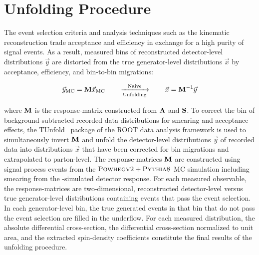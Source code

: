 \section{Unfolding Procedure}
The event selection criteria and analysis techniques such as the \ttbar kinematic reconstruction trade acceptance and efficiency in exchange for a high purity of signal events.
As a result, measured bins of reconstructed detector-level distributions $\vec{y}$ are distorted from the true generator-level distributions $\vec{x}$ by acceptance, efficiency, and bin-to-bin migrations:
\begin{linenomath*}
\begin{align}
\vec{y}_{\text{MC}} = \mathbf{M} \vec{x}_{\text{MC}} \quad \quad \xrightarrow[\text{Unfolding}]{\text{Naive}} \quad \quad \vec{x} = \mathbf{M}^{-1} \vec{y}
\end{align}
\end{linenomath*}
where $\mathbf{M}$ is the response-matrix constructed from $\mathbf{A}$ and $\mathbf{S}$.
To correct the bin of background-subtracted recorded data distributions for smearing and acceptance effects, the TUnfold~\cite{TUnfold} package of the ROOT data analysis framework is used to simultaneously invert $\mathbf{M}$ and unfold the detector-level distributions $\vec{y}$ of recorded data into distributions $\vec{x}$ that have been corrected for bin migrations and extrapolated to parton-level.
The response-matrices $\mathbf{M}$ are constructed using signal process events from the ${\textsc{Powhegv2}} + {\textsc{Pythia8}}$ MC simulation including smearing from the \Geant-simulated detector response.
For each measured observable, the response-matrices are two-dimensional, reconstructed detector-level versus true generator-level distributions containing events that pass the event selection.
In each generator-level bin, the true generated events in that bin that do not pass the event selection are filled in the underflow.
For each measured distribution, the absolute differential cross-section, the differential cross-section normalized to unit area, and the extracted spin-density coefficients constitute the final results of the unfolding procedure.

